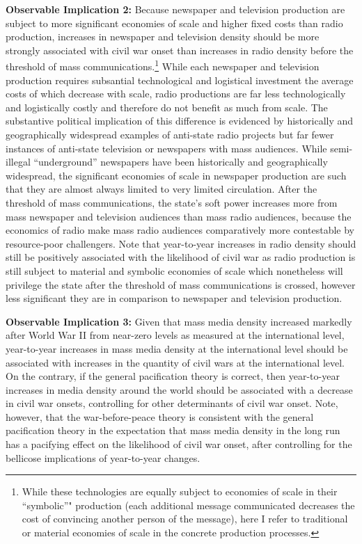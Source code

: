 \documentclass[11pt,article,oneside]{memoir}
\begin{document}
\textbf{Observable Implication 2:} Because newspaper and television
production are subject to more significant economies of scale and higher
fixed costs than radio production, increases in newspaper and television
density should be more strongly associated with civil war onset than
increases in radio density before the threshold of mass
communications.\footnote{While these technologies are equally subject to
  economies of scale in their ``symbolic''" production (each additional
  message communicated decreases the cost of convincing another person
  of the message), here I refer to traditional or material economies of
  scale in the concrete production processes.} While each newspaper and
television production requires subsantial technological and logistical
investment the average costs of which decrease with scale, radio
productions are far less technologically and logistically costly and
therefore do not benefit as much from scale. The substantive political
implication of this difference is evidenced by historically and
geographically widespread examples of anti-state radio projects but far
fewer instances of anti-state television or newspapers with mass
audiences. While semi-illegal ``underground'' newspapers have been
historically and geographically widespread, the significant economies of
scale in newspaper production are such that they are almost always
limited to very limited circulation. After the threshold of mass
communications, the state's soft power increases more from mass
newspaper and television audiences than mass radio audiences, because
the economics of radio make mass radio audiences comparatively more
contestable by resource-poor challengers. Note that year-to-year
increases in radio density should still be positively associated with
the likelihood of civil war as radio production is still subject to
material and symbolic economies of scale which nonetheless will
privilege the state after the threshold of mass communications is
crossed, however less significant they are in comparison to newspaper
and television production.

\textbf{Observable Implication 3:} Given that mass media density
increased markedly after World War II from near-zero levels as measured
at the international level, year-to-year increases in mass media density
at the international level should be associated with increases in the
quantity of civil wars at the international level. On the contrary, if
the general pacification theory is correct, then year-to-year increases
in media density around the world should be associated with a decrease
in civil war onsets, controlling for other determinants of civil war
onset. Note, however, that the war-before-peace theory is consistent
with the general pacification theory in the expectation that mass media
density in the long run has a pacifying effect on the likelihood of
civil war onset, after controlling for the bellicose implications of
year-to-year changes.
\end{document}
